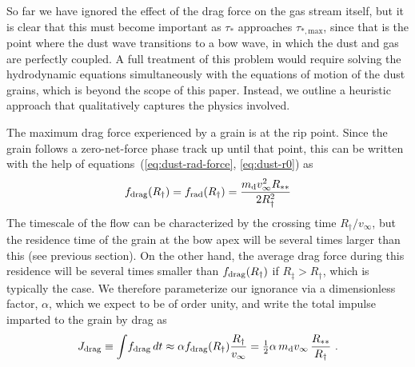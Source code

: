 So far we have ignored the effect of the drag force on the gas stream
itself, but it is clear that this must become important as \(\tau_*\)
approaches \(\tau_{*,\text{max}}\), since that is the point where the
dust wave transitions to a bow wave, in which the dust and gas are
perfectly coupled.  A full treatment of this problem would require
solving the hydrodynamic equations simultaneously with the equations
of motion of the dust grains, which is beyond the scope of this paper.
Instead, we outline a heuristic approach that qualitatively captures
the physics involved.

The maximum drag force experienced by a grain is at the rip point.
Since the grain follows a zero-net-force phase track up until that
point, this can be written with the help of
equations~(\ref{eq:dust-rad-force}, \ref{eq:dust-r0}) as
\begin{equation}
  \label{eq:fdrag-max}
  f_{\text{drag}} (R_\dag) = f_{\text{rad}}(R_\dag) =   \frac{m_{\text{d}} v_\infty^2 R_{**}}{ 2 R_\dag^2} 
\end{equation}
The timescale of the flow can be characterized by the crossing time
\(R_\dag / v_\infty\), but the residence time of the grain at the bow apex
will be several times larger than this (see previous section).  On the
other hand, the average drag force during this residence will be
several times smaller than \(f_{\text{drag}} (R_\dag)\) if
\(R_\ddag > R_\dag\), which is typically the case.  We therefore parameterize
our ignorance via a dimensionless factor, \(\alpha\), which we expect to be
of order unity, and write the total impulse imparted to the grain by
drag as
\begin{equation}
  \label{eq:grain-impulse}
  J\drag \equiv \int \!f\drag \, dt \approx \alpha f\drag (R_\dag) \frac{R_\dag}{v_\infty}
  = \tfrac12 \alpha \, m\grain v_\infty \, \frac{R\starstar}{R_\dag} \ .
\end{equation}

